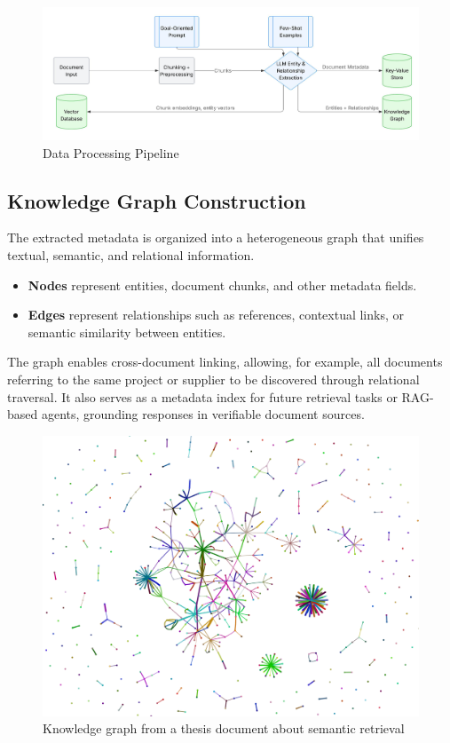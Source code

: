 \begin{figure}
    \centering
    \includegraphics[width=1\linewidth]{Images/Fluxograma_Data_Processing_Pipeline.jpeg}
    \caption{Data Processing Pipeline}
    \label{fig:data-pipeline}
\end{figure}

\subsection{Knowledge Graph Construction}
The extracted metadata is organized into a heterogeneous graph that unifies textual, semantic, and relational information.

\begin{itemize}
    \item \textbf{Nodes} represent entities, document chunks, and other metadata fields.
    \item \textbf{Edges} represent relationships such as references, contextual links, or semantic similarity between entities.
\end{itemize}

The graph enables cross-document linking, allowing, for example, all documents referring to the same project or supplier to be discovered through relational traversal.  
It also serves as a metadata index for future retrieval tasks or RAG-based agents, grounding responses in verifiable document sources.

\begin{figure}[H]
    \centering
    \includegraphics[width=0.5\linewidth]{Images/graph_visualisation_big.png}
    \caption{Knowledge graph from a thesis document about semantic retrieval}
    \label{fig:knowledge-graph}
\end{figure}

